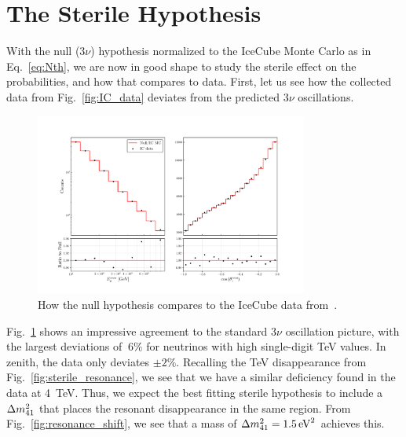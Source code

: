 % 

% 
\section{The Sterile Hypothesis}\label{sec:sterileResults}
With the null ($3\nu$) hypothesis normalized to the IceCube Monte Carlo as in Eq.~\ref{eq:Nth}, we are now in good shape to study the sterile effect on the probabilities, and how that compares to data.
First, let us see how the collected data from Fig.~\ref{fig:IC_data} deviates from the predicted $3\nu$ oscillations.
\begin{figure}
    \centering
    \includegraphics[width=0.8\textwidth]{figures/IC_rates.pdf}
    \caption{How the null hypothesis compares to the IceCube data from~\cite{IC2020}.}\label{fig:IC_rates}
\end{figure}
Fig.~\ref{fig:IC_rates} shows an impressive agreement to the standard $3\nu$ oscillation picture, with the largest deviations of $~6\%$
for neutrinos with high single-digit \si{\TeV} values. In zenith, the data only deviates $\pm 2\%$. Recalling the \si{\TeV} disappearance from 
Fig.~\ref{fig:sterile_resonance}, we see that we have a similar deficiency found in the data at \SI{4}{\TeV}. Thus, we expect the best fitting 
sterile hypothesis to include a $\dm[41]$ that places the resonant disappearance in the same region. From Fig.~\ref{fig:resonance_shift}, we see
that a mass of $\dm[41] = \SI{1.5}{\eV \squared}$ achieves this. 

